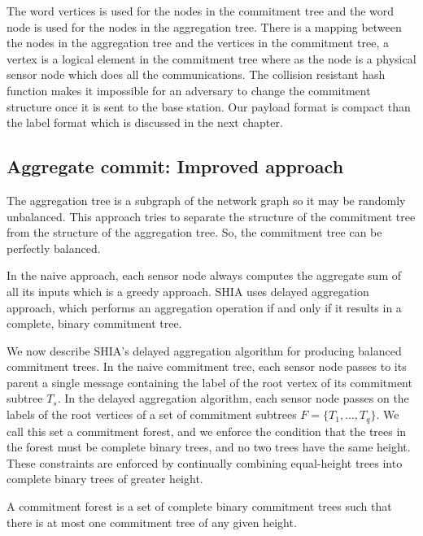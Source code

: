 		The word vertices is used for the nodes in the commitment tree and the word node is used for the nodes in the aggregation tree.
		There is a mapping between the nodes in the aggregation tree and the vertices in the commitment tree, a vertex is a logical element in the commitment tree where as the node is a physical sensor node which does all the communications.		
		The collision resistant hash function makes it impossible for an adversary to change the commitment structure once it is sent to the base station.
		Our payload format is compact than the label format which is discussed in the next chapter.
		
		\subsection{Aggregate commit: Improved approach} 
			\label{sub:aggregate_commit_improved_approach}
			The aggregation tree is a subgraph of the network graph so it may be randomly unbalanced.
			This approach tries to separate the structure of the commitment tree from the structure of the aggregation tree.
			So, the commitment tree can be perfectly balanced.

			In the naive approach, each sensor node always computes the aggregate sum of all its inputs which is a greedy approach.
			SHIA uses delayed aggregation approach, which performs an aggregation operation if and only if it results in a complete, binary commitment tree.

			We now describe SHIA's delayed aggregation algorithm for producing balanced commitment trees.
			In the naive commitment tree, each sensor node passes to its parent a single message containing the label of the root vertex of its commitment subtree $T_{s}$.
			In the delayed aggregation algorithm, each sensor node passes on the labels of the root vertices of a set of commitment subtrees $F = \{ T_{1}, \dotsc, T_{q} \}$.
			We call this set a commitment forest, and we enforce the condition that the trees in the forest must be complete binary trees, and no two trees have the same height. 
			These constraints are enforced by continually combining equal-height trees into complete binary trees of greater height.
			\begin{definition}
				\cite{chan2006secure}
				\label{def:commitment-forest}
				A commitment forest is a set of complete binary commitment trees such that there is at most one commitment tree of any given height.
			\end{definition}

